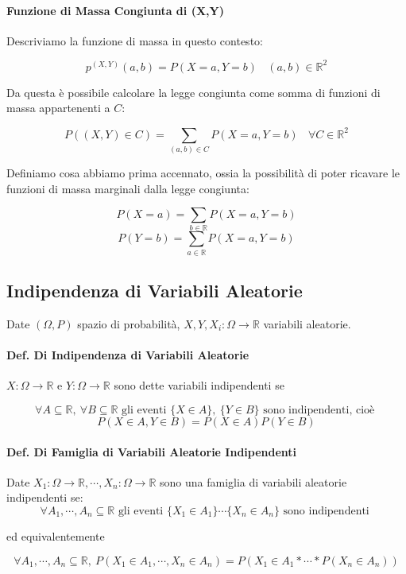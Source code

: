 \documentclass{article}
\begin{document}
\paragraph{Funzione di Massa Congiunta di (X,Y)} Descriviamo la funzione di massa in questo contesto:

\[ p^{(X,Y)}(a,b) = P(X=a,Y=b) \:\:\:\: (a,b) \in \mathbb{R}^{2} \]

Da questa è possibile calcolare la legge congiunta come somma di funzioni di massa appartenenti a $C$:

\[ P((X,Y) \in C) = \sum_{(a,b) \in C} P(X=a, Y=b) \:\:\:\: \forall C \in \mathbb{R}^{2} \]

Definiamo cosa abbiamo prima accennato, ossia la possibilità di poter ricavare le funzioni di massa marginali dalla legge congiunta:

\[ P(X = a) = \sum_{b \in \mathbb{R}} P(X=a, Y=b) \]
\[ P(Y = b) = \sum_{a \in \mathbb{R}} P(X=a, Y=b) \]

\subsection{Indipendenza di Variabili Aleatorie}

Date $(\Omega, P)$ spazio di probabilità, $X,Y,X_{i}: \Omega \rightarrow \mathbb{R}$ variabili aleatorie.

\paragraph{Def. Di Indipendenza di Variabili Aleatorie} $X: \Omega \rightarrow \mathbb{R}$ e $Y: \Omega \rightarrow \mathbb{R}$ sono dette variabili indipendenti se

\[ \forall A \subseteq \mathbb{R}, \: \forall B \subseteq \mathbb{R} \text{ gli eventi } \{ X \in A \}, \:\{ Y \in B \} \text{ sono indipendenti, cioè } \]
\[ P(X \in A, Y \in B) = P(X \in A) P(Y \in B) \]

\paragraph{Def. Di Famiglia di Variabili Aleatorie Indipendenti} Date $X_{1} : \Omega \rightarrow \mathbb{R}, \cdots, X_{n} : \Omega \rightarrow \mathbb{R}$ sono una famiglia di variabili aleatorie indipendenti se:
\[ \forall A_{1}, \cdots, A_{n} \subseteq \mathbb{R} \text{ gli eventi  } \{ X_{1} \in A_{1} \} \cdots \{ X_{n} \in A_{n}\} \text{ sono indipendenti }  \]
\begin{center}
    ed equivalentemente
\end{center}
\[ \forall A_{1}, \cdots, A_{n} \subseteq \mathbb{R}, \: P(X_{1} \in A_{1}, \cdots,X_{n} \in A_{n}) = P(X_{1} \in A_{1} * \cdots * P(X_{n} \in A_{n}))  \]
\end{document}
